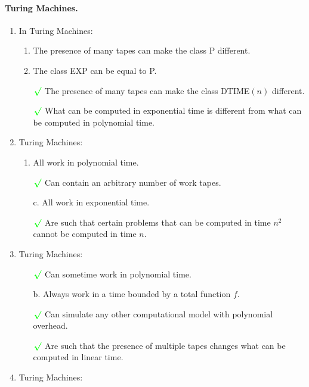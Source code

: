 \documentclass{article}
\begin{document}
			\paragraph{Turing Machines.}
			\begin{enumerate}[label=\textbf{\arabic*.}, leftmargin=*]
				\item In Turing Machines:
				\begin{enumerate}[label=\alph*.]
					\item The presence of many tapes can make the class P different.
					\item The class EXP can be equal to P.
					\item[$\color{green}\boldsymbol{\surd}$] The presence of many tapes can make the class DTIME$(n)$ different.
					\item[$\color{green}\boldsymbol{\surd}$] What can be computed in exponential time is different from what can be computed in polynomial time.
				\end{enumerate}
				\item Turing Machines:
				\begin{enumerate}[label=\alph*.]
					\item All work in polynomial time.
					\item[$\color{green}\boldsymbol{\surd}$] Can contain an arbitrary number of work tapes.
					\item[c.] All work in exponential time.
					\item[$\color{green}\boldsymbol{\surd}$] Are such that certain problems that can be computed in time $n^2$ cannot be computed in time $n$.
				\end{enumerate}
				\item Turing Machines:
				\begin{enumerate}[label=\alph*.]
					\item[$\color{green}\boldsymbol{\surd}$] Can sometime work in polynomial time.
					\item[b.] Always work in a time bounded by a total function $f$.
					\item[$\color{green}\boldsymbol{\surd}$] Can simulate any other computational model with polynomial overhead.
					\item[$\color{green}\boldsymbol{\surd}$] Are such that the presence of multiple tapes changes what can be computed in linear time.
				\end{enumerate}
				\item Turing Machines:
				\begin{enumerate}[label=\alph*.]

\end{enumerate}
\end{enumerate}
\end{document}
